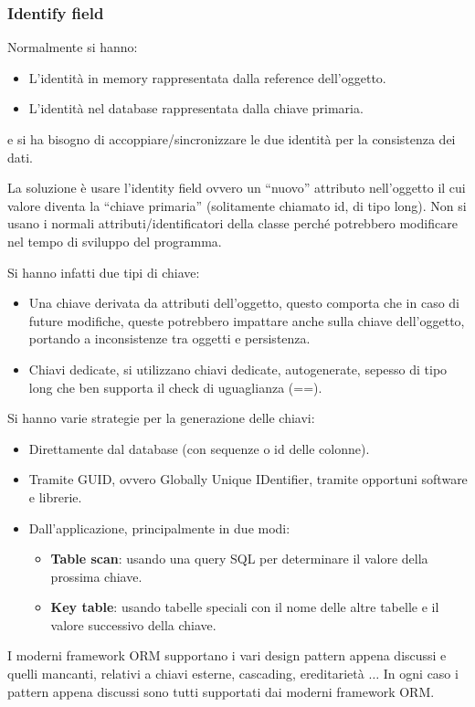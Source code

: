 \subsubsection{Identify field}
Normalmente si hanno:
\begin{itemize}
      \item L'identità in memory rappresentata dalla reference dell'oggetto.
      \item L'identità nel database rappresentata dalla chiave primaria.
\end{itemize}
e si ha bisogno di accoppiare/sincronizzare le due identità per la consistenza
dei dati.

La soluzione è usare l'identity field ovvero un “nuovo” attributo nell'oggetto
il cui valore diventa la “chiave primaria” (solitamente chiamato id, di tipo long).
Non si usano i normali attributi/identificatori della classe perché potrebbero
modificare nel tempo di sviluppo del programma.

Si hanno infatti due tipi di chiave:
\begin{itemize}
      \item Una chiave derivata da attributi dell'oggetto, questo comporta
            che in caso di future modifiche, queste potrebbero impattare anche
            sulla chiave dell'oggetto, portando a inconsistenze tra oggetti e
            persistenza.
      \item Chiavi dedicate, si utilizzano chiavi dedicate, autogenerate, sepesso
            di tipo long che ben supporta il check di uguaglianza (==).
\end{itemize}
Si hanno varie strategie per la generazione delle chiavi:
\begin{itemize}
      \item Direttamente dal database (con sequenze o id delle colonne).
      \item Tramite GUID, ovvero Globally Unique IDentifier, tramite opportuni
            software e librerie.
      \item Dall'applicazione, principalmente in due modi:
            \begin{itemize}
                  \item \textbf{Table scan}: usando una query SQL per determinare
                        il valore della prossima chiave.
                  \item \textbf{Key table}: usando tabelle speciali con il nome
                        delle altre tabelle e il valore successivo della chiave.
            \end{itemize}
\end{itemize}
I moderni framework ORM supportano i vari design pattern appena discussi e quelli
mancanti, relativi a chiavi esterne, cascading, ereditarietà $\dots$ In ogni caso
i pattern appena discussi sono tutti supportati dai moderni framework ORM.
